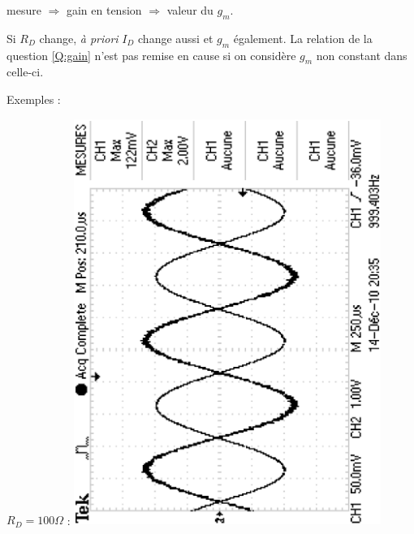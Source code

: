 \documentclass{../template/tp}
\begin{document}
{
mesure $\Longrightarrow$ gain en tension $\Longrightarrow $ valeur du $g_m$.

Si $R_D$ change, \textit{à priori} $I_D$ change aussi et $g_m$ également. La relation de la question \ref{Q:gain} n'est pas remise en cause si on considère $g_m$ non constant dans celle-ci.

Exemples :
\begin{center}
$R_D=100\Omega$ :
\includegraphics[angle=270, width=10cm]{mesures/tek0006.eps}


\end{center}}
\end{document}
